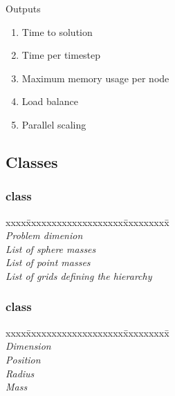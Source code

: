 \documentclass[11pt]{article}
\begin{document}
Outputs

\begin{enumerate}
\item Time to solution
\item Time per timestep
\item Maximum memory usage per node
\item Load balance
\item Parallel scaling
\end{enumerate}

\subsection{Classes} \label{ss:classes}

\subsubsection{ class}


\begin{tabbing}
xxxx\=xxxxxxxxxxxxxxxxxxx\=xxxxxxxxx\=\kill\\ 
\>   \>                      \> \textit{Problem dimenion} \\
\>   \>  \> \textit{List of sphere masses} \\
\>   \>   \> \textit{List of point masses} \\
\>   \>    \> \textit{List of grids defining the hierarchy} \\
\end{tabbing}

\subsubsection{ class}

\begin{tabbing}
xxxx\=xxxxxxxxxxxxxxxxxxx\=xxxxxxxxx\=\kill\\ 
\>   \>     \> \textit{Dimension} \\
\>   \>    \> \textit{Position} \\
\>   \>     \> \textit{Radius} \\
\>   \>     \> \textit{Mass} \\
\end{tabbing}
\end{document}
